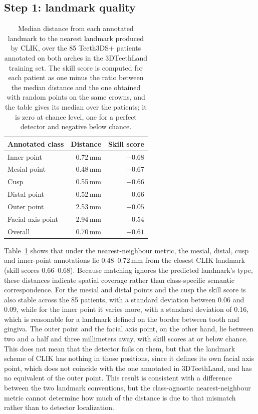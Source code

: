 \documentclass[10pt,a4paper]{article}
\begin{document}
\subsection{Step 1: landmark quality}

\begin{table}[htbp]
\centering
\small
\begin{tabularx}{\textwidth}{@{}Xrr@{}}
\toprule
Annotated class & Distance & Skill score \\
\midrule
Inner point       & 0.72\,mm & $+0.68$ \\
Mesial point      & 0.48\,mm & $+0.67$ \\
Cusp              & 0.55\,mm & $+0.66$ \\
Distal point      & 0.52\,mm & $+0.66$ \\
Outer point       & 2.53\,mm & $-0.05$ \\
Facial axis point & 2.94\,mm & $-0.54$ \\
\midrule
Overall           & 0.70\,mm & $+0.61$ \\
\bottomrule
\end{tabularx}
\caption{Median distance from each annotated landmark to the nearest landmark produced by CLIK, over the 85 Teeth3DS+ patients annotated on both arches in the 3DTeethLand training set. The skill score is computed for each patient as one minus the ratio between the median distance and the one obtained with random points on the same crowns, and the table gives its median over the patients; it is zero at chance level, one for a perfect detector and negative below chance.}
\label{tab:step1}
\end{table}

Table~\ref{tab:step1} shows that under the nearest-neighbour metric, the mesial, distal, cusp and inner-point annotations lie 0.48--0.72\,mm from the closest CLIK landmark (skill scores 0.66--0.68). Because matching ignores the predicted landmark's type, these distances indicate spatial coverage rather than class-specific semantic correspondence. For the mesial and distal points and the cusp the skill score is also stable across the 85 patients, with a standard deviation between 0.06 and 0.09, while for the inner point it varies more, with a standard deviation of 0.16, which is reasonable for a landmark defined on the border between tooth and gingiva. The outer point and the facial axis point, on the other hand, lie between two and a half and three millimeters away, with skill scores at or below chance. This does not mean that the detector fails on them, but that the landmark scheme of CLIK has nothing in those positions, since it defines its own facial axis point, which does not coincide with the one annotated in 3DTeethLand, and has no equivalent of the outer point. This result is consistent with a difference between the two landmark conventions, but the class-agnostic nearest-neighbour metric cannot determine how much of the distance is due to that mismatch rather than to detector localization.
\end{document}
